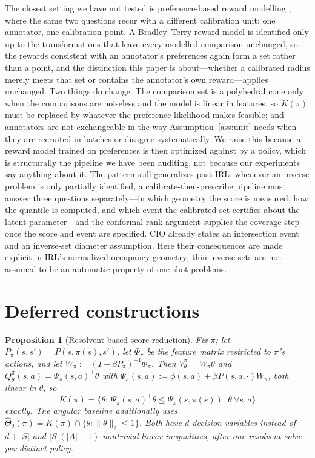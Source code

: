\documentclass{article}
\newtheorem{proposition}{Proposition}
\begin{document}
The closest setting we have not tested is preference-based reward modelling
\citep{christiano2017deep,rafailov2023direct}, where the same two questions
recur with a different calibration unit: one annotator, one calibration point.
A Bradley--Terry reward model is identified only up to the transformations that
leave every modelled comparison unchanged, so the rewards consistent with an
annotator's preferences again form a set rather than a point, and the
distinction this paper is about---whether a calibrated radius merely meets that
set or contains the annotator's own reward---applies unchanged. Two things do
change. The comparison set is a polyhedral cone only when the comparisons are
noiseless and the model is linear in features, so $K(\pi)$ must be replaced by
whatever the preference likelihood makes feasible; and annotators are not
exchangeable in the way Assumption~\ref{ass:unit} needs when they are recruited
in batches or disagree systematically. We raise this because a reward model
trained on preferences is then optimized against by a policy, which is
structurally the pipeline we have been auditing, not because our experiments
say anything about it. The pattern
still generalizes past IRL: whenever an inverse problem is only partially
identified, a calibrate-then-prescribe pipeline must answer three questions
separately---in which geometry the score is measured, how the quantile is
computed, and which event the calibrated set certifies about the latent
parameter---and the conformal rank argument supplies the coverage step once
the score and event are specified. CIO already states an intersection event
and an inverse-set diameter assumption. Here their consequences are made
explicit in IRL's normalized occupancy geometry; thin inverse sets are not
assumed to be an automatic property of one-shot problems.




\appendix

\section{Deferred constructions}
\label{app:angular}

\begin{proposition}[Resolvent-based score reduction]
\label{prop:resolvent}
Fix $\pi$; let $P_\pi(s,s')=P(s,\pi(s),s')$, let $\Phi_\pi$ be the feature
matrix restricted to $\pi$'s actions, and let $W_\pi:=(I-\beta
P_\pi)^{-1}\Phi_\pi$. Then $V^\pi_\theta=W_\pi\theta$ and
$Q^\pi_\theta(s,a)=\Psi_\pi(s,a)^\top\theta$ with
$\Psi_\pi(s,a):=\phi(s,a)+\beta P(s,a,\cdot)W_\pi$, both linear in $\theta$, so
\[
K(\pi)=\{\theta:\
\Psi_\pi(s,a)^\top\theta\le\Psi_\pi(s,\pi(s))^\top\theta\ \forall s,a\}
\]
exactly. The angular baseline additionally uses
$\hat\Theta_2(\pi)=K(\pi)\cap\{\theta:\|\theta\|_2\le1\}$. Both have $d$
decision variables instead of $d+|S|$ and $|S|(|A|-1)$ nontrivial linear
inequalities, after one resolvent solve per distinct policy.
\end{proposition}
\end{document}
